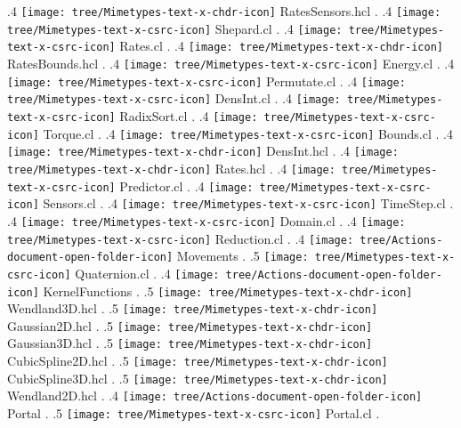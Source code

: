 {.4 { \texttt{[image: tree/Mimetypes-text-x-chdr-icon]} RatesSensors.hcl }.
.4 { \texttt{[image: tree/Mimetypes-text-x-csrc-icon]} Shepard.cl }.
.4 { \texttt{[image: tree/Mimetypes-text-x-csrc-icon]} Rates.cl }.
.4 { \texttt{[image: tree/Mimetypes-text-x-chdr-icon]} RatesBounds.hcl }.
.4 { \texttt{[image: tree/Mimetypes-text-x-csrc-icon]} Energy.cl }.
.4 { \texttt{[image: tree/Mimetypes-text-x-csrc-icon]} Permutate.cl }.
.4 { \texttt{[image: tree/Mimetypes-text-x-csrc-icon]} DensInt.cl }.
.4 { \texttt{[image: tree/Mimetypes-text-x-csrc-icon]} RadixSort.cl }.
.4 { \texttt{[image: tree/Mimetypes-text-x-csrc-icon]} Torque.cl }.
.4 { \texttt{[image: tree/Mimetypes-text-x-csrc-icon]} Bounds.cl }.
.4 { \texttt{[image: tree/Mimetypes-text-x-chdr-icon]} DensInt.hcl }.
.4 { \texttt{[image: tree/Mimetypes-text-x-chdr-icon]} Rates.hcl }.
.4 { \texttt{[image: tree/Mimetypes-text-x-csrc-icon]} Predictor.cl }.
.4 { \texttt{[image: tree/Mimetypes-text-x-csrc-icon]} Sensors.cl }.
.4 { \texttt{[image: tree/Mimetypes-text-x-csrc-icon]} TimeStep.cl }.
.4 { \texttt{[image: tree/Mimetypes-text-x-csrc-icon]} Domain.cl }.
.4 { \texttt{[image: tree/Mimetypes-text-x-csrc-icon]} Reduction.cl }.
.4 { \texttt{[image: tree/Actions-document-open-folder-icon]} Movements }.
.5 { \texttt{[image: tree/Mimetypes-text-x-csrc-icon]} Quaternion.cl }.
.4 { \texttt{[image: tree/Actions-document-open-folder-icon]} KernelFunctions }.
.5 { \texttt{[image: tree/Mimetypes-text-x-chdr-icon]} Wendland3D.hcl }.
.5 { \texttt{[image: tree/Mimetypes-text-x-chdr-icon]} Gaussian2D.hcl }.
.5 { \texttt{[image: tree/Mimetypes-text-x-chdr-icon]} Gaussian3D.hcl }.
.5 { \texttt{[image: tree/Mimetypes-text-x-chdr-icon]} CubicSpline2D.hcl }.
.5 { \texttt{[image: tree/Mimetypes-text-x-chdr-icon]} CubicSpline3D.hcl }.
.5 { \texttt{[image: tree/Mimetypes-text-x-chdr-icon]} Wendland2D.hcl }.
.4 { \texttt{[image: tree/Actions-document-open-folder-icon]} Portal }.
.5 { \texttt{[image: tree/Mimetypes-text-x-csrc-icon]} Portal.cl }.
}
